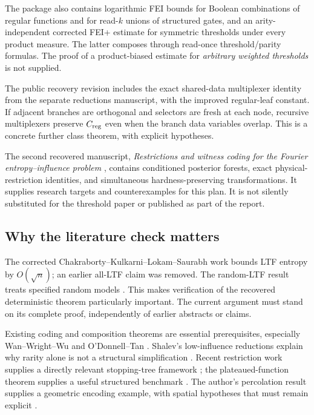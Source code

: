 \documentclass[11pt]{article}
\newcommand{\Creg}{C_{\rm reg}}\newcommand{\Rcost}{\mathcal R_f}
\begin{document}
The package also contains logarithmic FEI bounds for Boolean combinations of regular functions and for read-$k$ unions of structured gates, and an arity-independent corrected FEI+ estimate for symmetric thresholds under every product measure. The latter composes through read-once threshold/parity formulas. The proof of a product-biased estimate for \emph{arbitrary weighted thresholds} is not supplied.

The public recovery revision includes the exact shared-data multiplexer identity from the separate reductions manuscript, with the improved regular-leaf constant. If adjacent branches are orthogonal and selectors are fresh at each node, recursive multiplexers preserve $\Creg$ even when the branch data variables overlap. This is a concrete further class theorem, with explicit hypotheses.

The second recovered manuscript, \emph{Restrictions and witness coding for the Fourier entropy--influence problem} \cite{Reductions}, contains conditioned posterior forests, exact physical-restriction identities, and simultaneous hardness-preserving transformations. It supplies research targets and counterexamples for this plan. It is not silently substituted for the threshold paper or published as part of the report.

\subsection{Why the literature check matters}

The corrected Chakraborty--Kulkarni--Lokam--Saurabh work bounds LTF entropy by $O(\sqrt n)$; an earlier all-LTF claim was removed. The random-LTF result treats specified random models \cite{CKLS,RandomLTF}. This makes verification of the recovered deterministic theorem particularly important. The current argument must stand on its complete proof, independently of earlier abstracts or claims.

Existing coding and composition theorems are essential prerequisites, especially Wan--Wright--Wu and O'Donnell--Tan \cite{WWW,ODT}. Shalev's low-influence reductions explain why rarity alone is not a structural simplification \cite{Shalev}. Recent restriction work supplies a directly relevant stopping-tree framework \cite{GMP}; the plateaued-function theorem supplies a useful structured benchmark \cite{Potapov}. The author's percolation result supplies a geometric encoding example, with spatial hypotheses that must remain explicit \cite{Percolation}.
\end{document}
